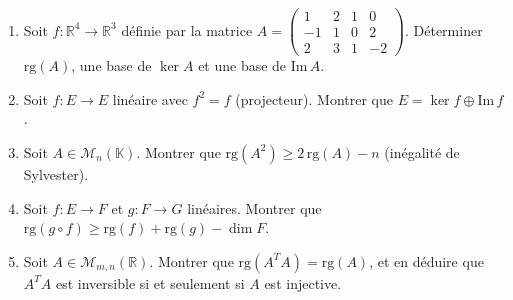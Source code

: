 \begin{mdframed}[style=exobar]
  \begin{enumerate}
    \item Soit $f : \mathbb{R}^4 \to \mathbb{R}^3$ définie par la matrice
          $A = \begin{pmatrix}1&2&1&0\\-1&1&0&2\\2&3&1&-2\end{pmatrix}$.
          Déterminer $\mathrm{rg}(A)$, une base de $\ker A$ et une base de $\mathrm{Im}\,A$.

    \item Soit $f : E \to E$ linéaire avec $f^2 = f$ (projecteur).
          Montrer que $E = \ker f \oplus \mathrm{Im}\,f$.

    \item Soit $A \in \mathcal{M}_n(\mathbb{K})$. Montrer que
          $\mathrm{rg}(A^2) \geq 2\,\mathrm{rg}(A) - n$
          (inégalité de Sylvester).

    \item Soit $f : E \to F$ et $g : F \to G$ linéaires. Montrer que
          $\mathrm{rg}(g\circ f) \geq \mathrm{rg}(f) + \mathrm{rg}(g) - \dim F$.

    \item Soit $A \in \mathcal{M}_{m,n}(\mathbb{R})$. Montrer que
          $\mathrm{rg}(A^T A) = \mathrm{rg}(A)$, et en déduire que
          $A^T A$ est inversible si et seulement si $A$ est injective.
  \end{enumerate}
\end{mdframed}


